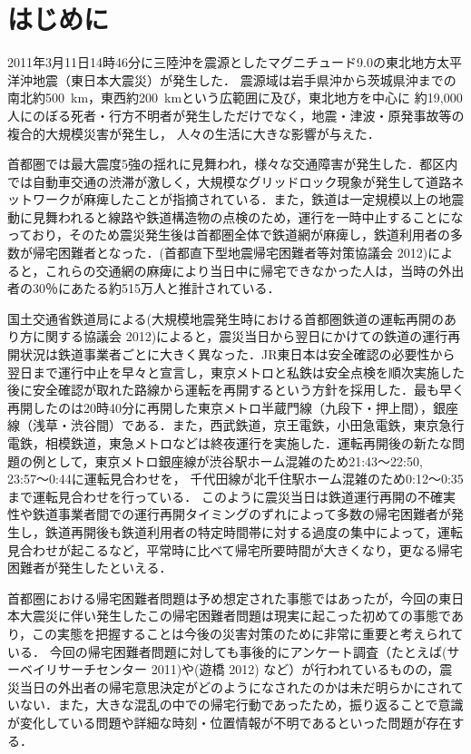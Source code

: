 \documentclass[japanese]{jnlp_1.4}
\begin{document}
\maketitle


\section{はじめに}

2011年3月11日14時46分に三陸沖を震源としたマグニチュード9.0の東北地方太平洋沖地震（東日本大震災）が発生した．
震源域は岩手県沖から茨城県沖までの南北約500~km，東西約200~kmという広範囲に及び，東北地方を中心に
約19,000人にのぼる死者・行方不明者が発生しただけでなく，地震・津波・原発事故等の複合的大規模災害が発生し，
人々の生活に大きな影響が与えた．

首都圏では最大震度5強の揺れに見舞われ，様々な交通障害が発生した．都区内では自動車交通の渋滞が激しく，大規模なグリッドロック現象が発生して道路ネットワークが麻痺したことが指摘されている．また，鉄道は一定規模以上の地震動に見舞われると線路や鉄道構造物の点検のため，運行を一時中止することになっており，そのため震災発生後は首都圏全体で鉄道網が麻痺し，鉄道利用者の多数が帰宅困難者となった．(首都直下型地震帰宅困難者等対策協議会 2012)によると，これらの交通網の麻痺により当日中に帰宅できなかった人は，当時の外出者の30％にあたる約515万人と推計されている．

国土交通省鉄道局による(大規模地震発生時における首都圏鉄道の運転再開のあり方に関する協議会 2012)によると，震災当日から翌日にかけての鉄道の運行再開状況は鉄道事業者ごとに大きく異なった．JR東日本は安全確認の必要性から翌日まで運行中止を早々と宣言し，東京メトロと私鉄は安全点検を順次実施した後に安全確認が取れた路線から運転を再開するという方針を採用した．最も早く再開したのは20時40分に再開した東京メトロ半蔵門線（九段下・押上間），銀座線（浅草・渋谷間）である．また，西武鉄道，京王電鉄，小田急電鉄，東京急行電鉄，相模鉄道，東急メトロなどは終夜運行を実施した．運転再開後の新たな問題の例として，東京メトロ銀座線が渋谷駅ホーム混雑のため21:43〜22:50, 23:57〜0:44に運転見合わせを，
千代田線が北千住駅ホーム混雑のため0:12〜0:35まで運転見合わせを行っている．
このように震災当日は鉄道運行再開の不確実性や鉄道事業者間での運行再開タイミングのずれによって多数の帰宅困難者が発生し，鉄道再開後も鉄道利用者の特定時間帯に対する過度の集中によって，運転見合わせが起こるなど，平常時に比べて帰宅所要時間が大きくなり，更なる帰宅困難者が発生したといえる．


首都圏における帰宅困難者問題は予め想定された事態ではあったが，今回の東日本大震災に伴い発生したこの帰宅困難者問題は現実に起こった初めての事態であり，この実態を把握することは今後の災害対策のために非常に重要と考えられている．
今回の帰宅困難者問題に対しても事後的にアンケート調査（たとえば(サーベイリサーチセンター 2011)や(遊橋 2012) など）が行われているものの，震災当日の外出者の帰宅意思決定がどのようになされたのかは未だ明らかにされていない．また，大きな混乱の中での帰宅行動であったため，振り返ることで意識が変化している問題や詳細な時刻・位置情報が不明であるといった問題が存在する．
\end{document}
